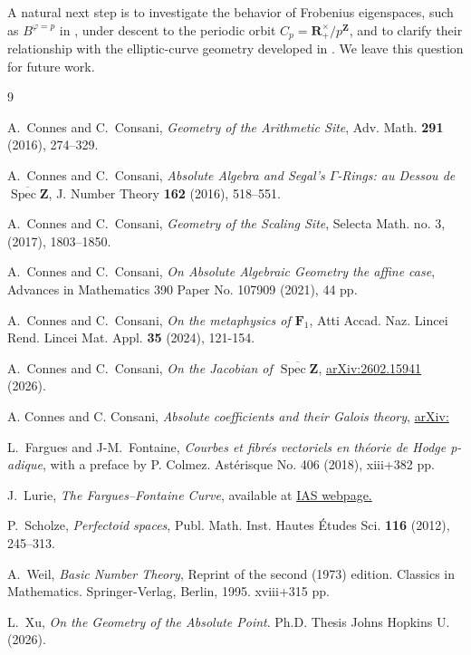 \documentclass[11pt,a4paper]{article}
\newcommand{\R}{\mathbf{R}}
\newcommand{\Z}{\mathbf{Z}}
\def\spzb{\overline{\Spec \Z}}
\newcommand{\Spec}{\operatorname{Spec}}
\begin{document}
A natural next step is to investigate the behavior of Frobenius eigenspaces, such as $B^{\varphi=p}$ in \cite{FF}, under descent to the periodic orbit
$C_p=\R_+^\times/p^\Z$,
and to clarify their relationship with the elliptic-curve geometry developed in \cite{CC3}. We leave this question for future work.







\begin{thebibliography}{9}

 A.~Connes and C.~Consani, {\em Geometry of the Arithmetic Site}, Adv. Math. {\bf 291} (2016), 274--329.

 A.~Connes and C.~Consani, {\em Absolute Algebra and Segal's $\Gamma$-Rings: au Dessou de $\spzb$}, J. Number Theory {\bf 162} (2016), 518--551.

 A.~Connes and C.~Consani, {\em Geometry of the Scaling Site}, Selecta Math. no. 3, (2017),  1803–1850.

 A.~Connes and C.~Consani, {\em On Absolute Algebraic Geometry the aﬃne case}, Advances in Mathematics 390 Paper No. 107909 (2021), 44 pp.



 A.~Connes and C.~Consani, {\em On the metaphysics of $\mathbf F_1$}, Atti Accad. Naz. Lincei Rend. Lincei Mat. Appl. {\bf 35} (2024), 121-154.

A.~Connes and C.~Consani,
\emph{On the Jacobian of $\spzb$},
\href{https://arxiv.org/abs/2602.15941}{arXiv:2602.15941}
(2026).

 A. Connes and C. Consani, \emph{Absolute coefficients and their Galois theory}, \href{https://arxiv.org/abs/2605.}{arXiv:}

 L.~Fargues and J-M.~Fontaine, {\em Courbes et fibrés vectoriels en théorie de Hodge p-adique}, with a preface by P. Colmez. Astérisque No. 406 (2018), xiii+382 pp.


J.~Lurie,
\emph{The Fargues--Fontaine Curve},
available at
\href{https://www.math.ias.edu/~lurie/205.html}{IAS webpage.}


 P.~Scholze, {\em Perfectoid spaces}, Publ. Math. Inst. Hautes Études Sci. {\bf 116} (2012), 245–313.

 A.~Weil, {\em Basic Number Theory}, Reprint of the second (1973) edition. Classics in Mathematics. Springer-Verlag, Berlin, 1995. xviii+315 pp.

 L.~Xu, {\em On the Geometry of the Absolute Point}. Ph.D. Thesis Johns Hopkins U. (2026).

\end{thebibliography}
\end{document}
